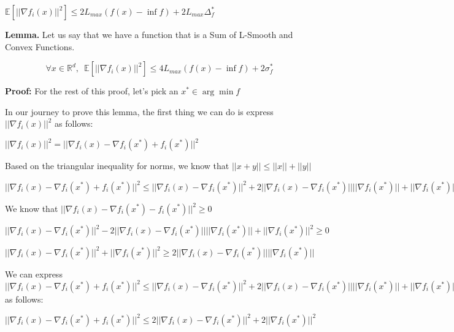 $ \mathbb{E} [||\nabla f_i(x)||^2] \leq  2L_{max} (f(x) - \inf f) + 2L_{max} \Delta_f^*$ \newline


\noindent \textbf{Lemma. } Let us say that we have a function that is a Sum of L-Smooth and Convex Functions. 

\begin{equation}
\forall x \in \mathbb{R}^d, \enspace \mathbb{E}[||\nabla f_i(x)||^2] \leq 4L_{max} (f(x) - \inf f) + 2\sigma^*_f
\end{equation}

\noindent \textbf{Proof: } \newline 
For the rest of this proof, let's pick an $x^* \in \arg \min f$

In our journey to prove this lemma, the first thing we can do is express $||\nabla f_i(x)||^2$ as follows: \newline 

$||\nabla f_i(x)||^2 = ||\nabla f_i(x) - \nabla f_i(x^*) + f_i(x^*)||^2$ \newline 

Based on the triangular inequality for norms, we know that $||x + y|| \leq ||x|| + ||y||$ \newline 

$||\nabla f_i(x) - \nabla f_i(x^*) + f_i(x^*)||^2 \leq ||\nabla f_i(x) - \nabla f_i(x^*)||^2 + 2 ||\nabla f_i(x) - \nabla f_i(x^*)|| ||\nabla f_i(x^*)|| + ||\nabla f_i(x^*)||^2$ \newline 

We know that $||\nabla f_i(x) - \nabla f_i(x^*) - f_i(x^*)||^2 \geq 0$ \newline 

$||\nabla f_i(x) - \nabla f_i(x^*)||^2 - 2 ||\nabla f_i(x) - \nabla f_i(x^*)|| ||\nabla f_i(x^*)|| + ||\nabla f_i(x^*)||^2 \geq 0$ \newline 

$||\nabla f_i(x) - \nabla f_i(x^*)||^2  + ||\nabla f_i(x^*)||^2 \geq 2 ||\nabla f_i(x) - \nabla f_i(x^*)|| ||\nabla f_i(x^*)||$ \newline 

We can express $||\nabla f_i(x) - \nabla f_i(x^*) + f_i(x^*)||^2 \leq ||\nabla f_i(x) - \nabla f_i(x^*)||^2 + 2 ||\nabla f_i(x) - \nabla f_i(x^*)|| ||\nabla f_i(x^*)|| + ||\nabla f_i(x^*)||^2$  as follows: \newline 

$||\nabla f_i(x) - \nabla f_i(x^*) + f_i(x^*)||^2 \leq 2||\nabla f_i(x) - \nabla f_i(x^*)||^2 + 2||\nabla f_i(x^*)||^2$ \newline 

